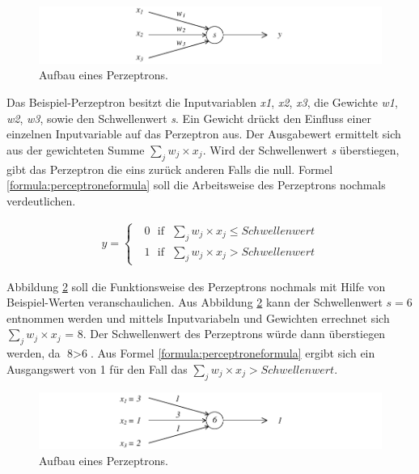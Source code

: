 \begin{figure}[ht]
\centering
\includegraphics{images/perceptron.pdf}
\caption{Aufbau eines Perzeptrons.}
\label{fig:perceptron}
\end{figure}

Das Beispiel-Perzeptron besitzt die Inputvariablen \textit{x1}, \textit{x2}, \textit{x3}, die Gewichte \textit{w1}, \textit{w2}, \textit{w3}, sowie den Schwellenwert \textit{s}. Ein Gewicht drückt den Einfluss einer einzelnen Inputvariable auf das Perzeptron aus. Der Ausgabewert ermittelt sich aus der gewichteten Summe $\sum_j w_{j}\times x_{j}$. Wird der Schwellenwert \textit{s} überstiegen, gibt das Perzeptron die eins zurück anderen Falls die null. Formel \ref{formula:perceptroneformula} soll die Arbeitsweise des Perzeptrons nochmals verdeutlichen.      

\begin{align}
\label{formula:perceptroneformula}
y = \begin{cases}\text{ }0\text{ }\text{if}\text{ }\sum_j w_{j}\times x_{j}\leq Schwellenwert\\\text{ }1\text{ }\text{if}\text{ }\sum_j w_{j}\times x_{j}> Schwellenwert\end{cases}
\end{align}

Abbildung \ref{fig:perceptronNumbered} soll die Funktionsweise des Perzeptrons nochmals mit Hilfe von Beispiel-Werten veranschaulichen. Aus Abbildung \ref{fig:perceptronNumbered} kann der Schwellenwert $s=6$ entnommen werden und mittels Inputvariabeln und Gewichten errechnet sich $\sum_j w_{j}\times x_{j}\text{ = 8}$. Der Schwellenwert des Perzeptrons würde dann überstiegen werden, da $\text{8}>\text{6}$. Aus Formel \ref{formula:perceptroneformula} ergibt sich ein Ausgangswert von 1 für den Fall das $\sum_j w_{j}\times x_{j}> Schwellenwert$.

\begin{figure}[ht]
\centering
\includegraphics{images/perceptronNumbered.pdf}
\caption{Aufbau eines Perzeptrons.}
\label{fig:perceptronNumbered}
\end{figure}

